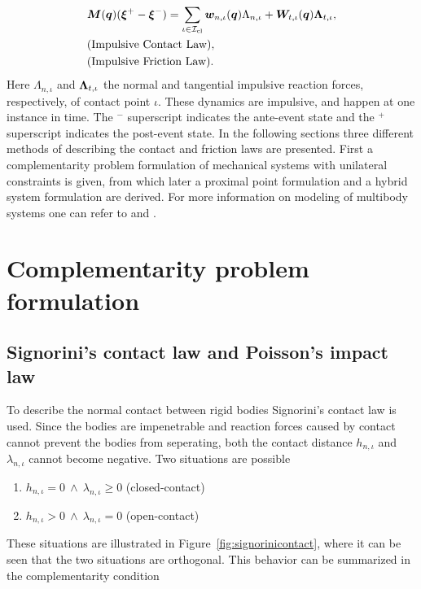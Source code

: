 \documentclass[../DC2017114Bouma.tex]{subfiles}
\begin{document}
\begin{align}
&{\boldsymbol{M}}({\boldsymbol{q}})(\boldsymbol{\xi}^+ - \boldsymbol{\xi}^-) = \sum_{\iota\in\mathcal{I}_{\text{cl}}} {\boldsymbol{w}}_{n,\iota}({\boldsymbol{q}})\Lambda_{n,\iota} + {\boldsymbol{W}}_{t,\iota}({\boldsymbol{q}})\boldsymbol{\Lambda}_{t,\iota}, \label{eq:appimp1}\\
&\text{(Impulsive Contact Law)},\nonumber\\
&\text{(Impulsive Friction Law)}.\nonumber
\end{align}
Here $\Lambda_{n,\iota}$ and $\boldsymbol{\Lambda}_{t,\iota}$ the normal and tangential impulsive reaction forces, respectively, of contact point $\iota$. These dynamics are impulsive, and happen at one instance in time. The $^-$ superscript indicates the ante-event state and the $^+$ superscript indicates the post-event state. In the following sections three different methods of describing the contact and friction laws are presented. First a complementarity problem formulation of mechanical systems with unilateral constraints is given, from which later a proximal point formulation and a hybrid system formulation are derived. For more information on modeling of multibody systems one can refer to \cite{Leine2008} and \cite{Wouw2016}.

\section{Complementarity problem formulation}\label{sec:comp}
\subsection{Signorini's contact law and Poisson's impact law}
To describe the normal contact between rigid bodies Signorini's contact law is used. Since the bodies are impenetrable and reaction forces caused by contact cannot prevent the bodies from seperating, both the contact distance $h_{n,\iota}$ and $\lambda_{n,\iota}$ cannot become negative. Two situations are possible

\begin{enumerate}
\item $h_{n,\iota}=0\ \wedge\ \lambda_{n,\iota} \geq 0$ (closed-contact)
\item $h_{n,\iota}>0\ \wedge\ \lambda_{n,\iota} = 0$ (open-contact)
\end{enumerate}

These situations are illustrated in Figure~\ref{fig:signorinicontact}, where it can be seen that the two situations are orthogonal. This behavior can be summarized in the complementarity condition
\end{document}
